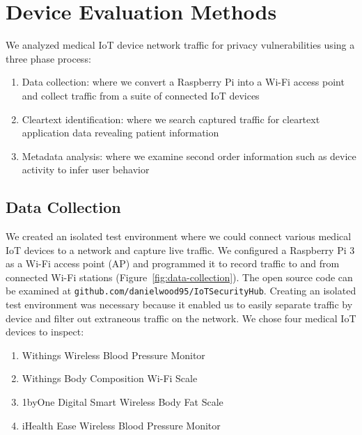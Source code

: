 \section{Device Evaluation Methods}

We analyzed medical IoT device network traffic for privacy vulnerabilities using a three phase process:

\begin{enumerate}
  \item Data collection: where we convert a Raspberry Pi into a Wi-Fi access point and collect traffic from a suite of connected IoT devices
  \item Cleartext identification: where we search captured traffic for cleartext application data revealing patient information
  \item Metadata analysis: where we examine second order information such as device activity to infer user behavior
\end{enumerate}

\subsection{Data Collection}

We created an isolated test environment where we could connect various medical IoT devices to a network and capture live traffic. We configured a Raspberry Pi 3 as a Wi-Fi access point (AP) and programmed it to record traffic to and from connected Wi-Fi stations (Figure~\ref{fig:data-collection}). The open source code can be examined at {\tt github.com/danielwood95/IoTSecurityHub}.  Creating an isolated test environment was necessary because it enabled us to easily separate traffic by device and filter out extraneous traffic on the network.   We chose four medical IoT devices to inspect:

\begin{enumerate}
  \item Withings Wireless Blood Pressure Monitor
  \item Withings Body Composition Wi-Fi Scale
  \item 1byOne Digital Smart Wireless Body Fat Scale
  \item iHealth Ease Wireless Blood Pressure Monitor
\end{enumerate}

